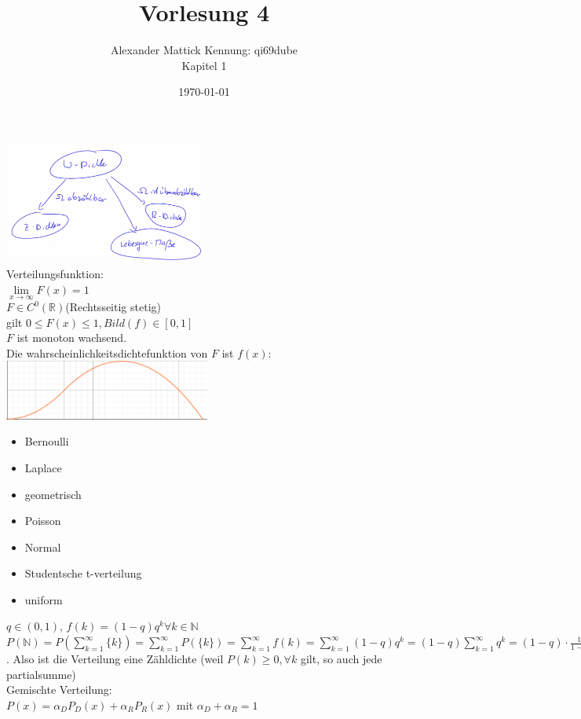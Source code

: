 \documentclass{article}
\author{
Alexander Mattick Kennung: qi69dube\\
Kapitel 1
}
\date{\today}
\title{Vorlesung 4}
\begin{document}
	\maketitle
	\includegraphics[width=256px]{diagram.png}\\
	Verteilungsfunktion:\\
	$\lim\limits_{x\to\infty} F(x)=1$\\
	$F\in C^0(\mathbb{R})$(Rechtsseitig stetig)\\
	gilt $0\leq F(x)\leq 1, Bild(f)\in[0,1]$\\
	$F$ ist monoton wachsend.\\
	Die wahrscheinlichkeitsdichtefunktion von $F$ ist $f(x)$:
	\includegraphics[width=256px]{funktionFvonf.png}\\
	\begin{itemize}
		\item Bernoulli
		\item Laplace
		\item geometrisch
		\item Poisson
		\item Normal
		\item Studentsche t-verteilung
		\item uniform
	\end{itemize}
	$q\in(0,1)$, $f(k)=(1-q)q^k\forall k\in\mathbb{N}$\\
	$P(\mathbb{N}) = P(\sum\limits_{k=1}^\infty \{k\}) = \sum\limits_{k=1}^\infty P(\{k\}) = \sum\limits_{k=1}^\infty f(k) = \sum\limits_{k=1}^\infty (1-q)q^k = (1-q)\sum\limits_{k=1}^\infty q^k = (1-q)\cdot \frac{1}{1-q}=1$. Also ist die Verteilung eine Zähldichte (weil $P(k)\geq 0,\forall k$ gilt, so auch jede partialsumme)\\
	Gemischte Verteilung:\\
	$P(x)=\alpha_D P_D(x)+\alpha_R P_R(x)$ mit $\alpha_D+\alpha_R = 1$\\
\end{document}
